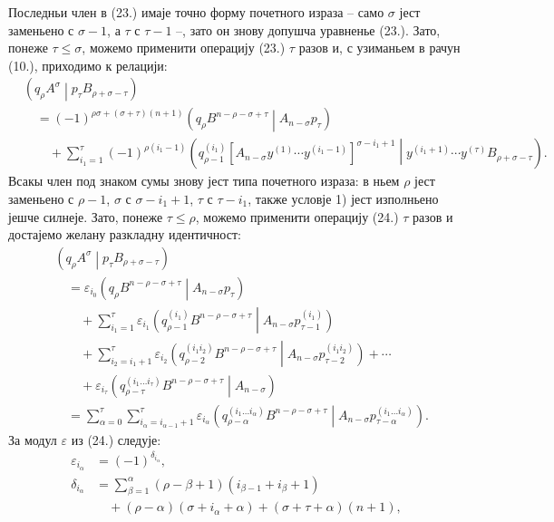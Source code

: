 ﻿\documentclass[11pt]{article}
\newcommand{\pair}[2]{\left(#1\middle|#2\right)}
\newcommand{\eps}{\varepsilon}
\begin{document}
Последньи член в (23.) имаје точно форму почетного израза -- само $\sigma$ јест заменьено с $\sigma-1$, а $\tau$ с $\tau-1$ --, зато он знову допушча уравненье (23.). Зато, понеже $\tau\le\sigma$, можемо применити операцију (23.) $\tau$ разов и, с узиманьем в рачун (10.), приходимо к релацији:
\begin{equation}
\begin{aligned}
&\pair{q_\rho A^\sigma}{p_\tau B_{\rho+\sigma-\tau}}\\
&\quad=(-1)^{\rho\sigma+(\sigma+\tau)(n+1)}
\pair{q_\rho B^{n-\rho-\sigma+\tau}}{A_{n-\sigma}p_\tau}\\
&\qquad+\sum_{i_1=1}^{\tau}(-1)^{\rho(i_1-1)}
\pair{q_{\rho-1}^{(i_1)}
[A_{n-\sigma}y^{(1)}\cdots y^{(i_1-1)}]^{\sigma-i_1+1}}
{y^{(i_1+1)}\cdots y^{(\tau)}B_{\rho+\sigma-\tau}}.
\end{aligned}
\tag{24}
\end{equation}
Всакы член под знаком сумы знову јест типа почетного израза: в ньем $\rho$ јест заменьено с $\rho-1$, $\sigma$ с $\sigma-i_1+1$, $\tau$ с $\tau-i_1$, также условје 1) јест изполньено јешче силнеје. Зато, понеже $\tau\le\rho$, можемо применити операцију (24.) $\tau$ разов и достајемо желану разкладну идентичност:
\begin{equation}
\begin{aligned}
&\pair{q_\rho A^\sigma}{p_\tau B_{\rho+\sigma-\tau}}\\
&\quad=\eps_{i_0}\pair{q_\rho B^{n-\rho-\sigma+\tau}}
{A_{n-\sigma}p_\tau}\\
&\qquad+\sum_{i_1=1}^{\tau}\eps_{i_1}
\pair{q_{\rho-1}^{(i_1)}B^{n-\rho-\sigma+\tau}}
{A_{n-\sigma}p_{\tau-1}^{(i_1)}}\\
&\qquad+\sum_{i_2=i_1+1}^{\tau}\eps_{i_2}
\pair{q_{\rho-2}^{(i_1i_2)}B^{n-\rho-\sigma+\tau}}
{A_{n-\sigma}p_{\tau-2}^{(i_1i_2)}}+\cdots\\
&\qquad+\eps_{i_\tau}
\pair{q_{\rho-\tau}^{(i_1\ldots i_\tau)}B^{n-\rho-\sigma+\tau}}
{A_{n-\sigma}}\\
&\quad=\sum_{\alpha=0}^{\tau}
\sum_{i_\alpha=i_{\alpha-1}+1}^{\tau}\eps_{i_\alpha}
\pair{q_{\rho-\alpha}^{(i_1\ldots i_\alpha)}B^{n-\rho-\sigma+\tau}}
{A_{n-\sigma}p_{\tau-\alpha}^{(i_1\ldots i_\alpha)}}.
\end{aligned}
\tag{25}
\end{equation}
За модул $\eps$ из (24.) следује:
\begin{equation}
\begin{aligned}
\eps_{i_\alpha}&=(-1)^{\delta_{i_\alpha}},\\
\delta_{i_\alpha}
&=\sum_{\beta=1}^{\alpha}(\rho-\beta+1)(i_{\beta-1}+i_\beta+1)\\
&\quad+(\rho-\alpha)(\sigma+i_\alpha+\alpha)
+(\sigma+\tau+\alpha)(n+1),
\end{aligned}
\tag{26}
\end{equation}
\end{document}
